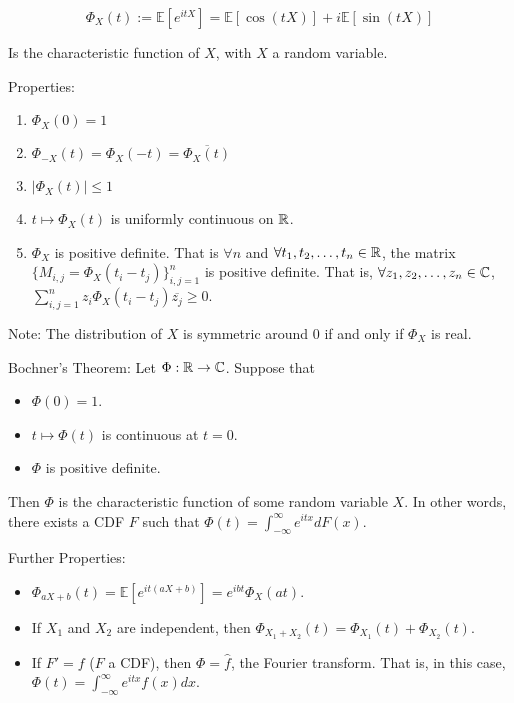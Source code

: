 \documentclass[english, course]{Notes}
\begin{document}
\begin{definition}
\[\Phi_X(t) := \mathbb{E}[e^{itX}] = \mathbb{E}[\cos(tX)] + i \mathbb{E}[\sin(tX)]\]

Is the characteristic function of $X$, with $X$ a random variable.\\
\end{definition}

Properties:

\begin{enumerate}
	\item $\Phi_X(0) = 1$
	\item $\Phi_{-X}(t) = \Phi_X(-t) = \overline{\Phi_X(t)}$
	\item $|\Phi_X(t)| \leq 1$
	\item $t \mapsto \Phi_X(t)$ is uniformly continuous on $\mathbb{R}$.
	\item $\Phi_X$ is positive definite. That is $\forall n$ and $\forall t_1, t_2, \dots, t_n \in \mathbb{R}$, the matrix $\{M_{i, j} = \Phi_X(t_i - t_j)\}_{i, j = 1}^n$ is positive definite. That is, $\forall z_1, z_2, \dots, z_n \in \mathbb{C}$, $\sum_{i, j = 1}^n z_i \Phi_X(t_i - t_j)\overline{z_j} \geq 0$.
\end{enumerate}

Note: The distribution of $X$ is symmetric around $0$ if and only if $\Phi_X$ is real.\\ 

\begin{theorem}
Bochner's Theorem: Let $\Phi: \mathbb{R} \to \mathbb{C}$. Suppose that

\begin{itemize}
	\item $\Phi(0) = 1$.
	\item $t \mapsto \Phi(t)$ is continuous at $t = 0$.
	\item $\Phi$ is positive definite.
\end{itemize}

Then $\Phi$ is the characteristic function of some random variable $X$. In other words, there exists a CDF $F$ such that $\Phi(t) = \int_{-\infty}^\infty e^{itx}dF(x)$.\\
\end{theorem}

Further Properties:

\begin{itemize}
	\item $\Phi_{aX + b}(t) = \mathbb{E}[e^{it(aX + b)}] = e^{ibt} \Phi_X(at)$.
	\item If $X_1$ and $X_2$ are independent, then $\Phi_{X_1 + X_2}(t) = \Phi_{X_1}(t) + \Phi_{X_2}(t)$.
	\item If $F' = f$ ($F$ a CDF), then $\Phi = \hat{f}$, the Fourier transform. That is, in this case, $\Phi(t) = \int_{-\infty}^\infty e^{itx}f(x)dx$. 
\end{itemize}
\end{document}
